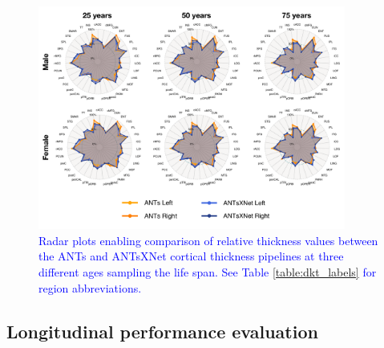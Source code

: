 \documentclass[
  12pt,
]{article}
\begin{document}
\begin{figure}[htb]
  \centering
    \includegraphics[width=0.9\textwidth]{Figures/radarSPRB.pdf}
  \caption{\textcolor{blue}{Radar plots enabling comparison of relative thickness values between
  the ANTs and ANTsXNet cortical thickness pipelines at three different ages
  sampling the life span.  See Table \ref{table:dkt_labels} for region abbreviations. }}
  \label{fig:radar}
\end{figure}

\hypertarget{longitudinal-performance-evaluation}{%
\subsection*{Longitudinal performance
evaluation}\label{longitudinal-performance-evaluation}}
\end{document}
